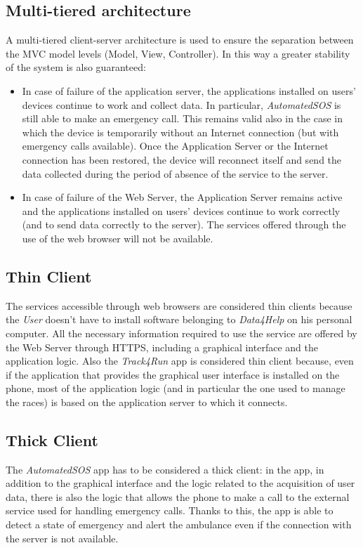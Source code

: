 \subsection{Multi-tiered architecture}
A multi-tiered client-server architecture is used to ensure the separation between the MVC model levels (Model, View, Controller).
In this way a greater stability of the system is also guaranteed:
\begin{itemize}
  \item In case of failure of the application server, the applications installed on users' devices continue to work and collect data. In particular, \textit{AutomatedSOS} is still able to make an emergency call. This remains valid also in the case in which the device is temporarily without an Internet connection (but with emergency calls available). Once the Application Server or the Internet connection has been restored, the device will reconnect itself and send the data collected during the period of absence of the service to the server.
  \item In case of failure of the Web Server, the Application Server remains active and the applications installed on users' devices continue to work correctly (and to send data correctly to the server). The services offered through the use of the web browser will not be available.
\end{itemize}

\subsection{Thin Client}
The services accessible through web browsers are considered thin clients because the \textit{User} doesn't have to install software belonging to \textit{Data4Help} on his personal computer.
All the necessary information required to use the service are offered by the Web Server through HTTPS, including a graphical interface and the application logic.
Also the \textit{Track4Run} app is considered thin client because, even if the application that provides the graphical user interface is installed on the phone, most of the application logic (and in particular the one used to manage the races) is based on the application server to which it connects.

\subsection{Thick Client}
The \textit{AutomatedSOS} app has to be considered a thick client: in the app, in addition to the graphical interface and the logic related to the acquisition of user data, there is also the logic that allows the phone to make a call to the external service used for handling emergency calls.
Thanks to this, the app is able to detect a state of emergency and alert the ambulance even if the connection with the server is not available.

